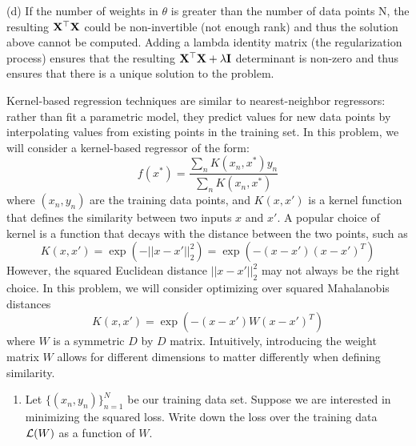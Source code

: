 \documentclass[submit]{harvardml}
\begin{document}
\bigskip \noindent (d) If the number of weights in $\theta$ is greater than the number of data points N, the resulting $\mathbf{X}^\top\mathbf{X}$ could be non-invertible (not enough rank) and thus the solution above cannot be computed. Adding a lambda identity matrix (the regularization process) ensures that the resulting $\mathbf{X}^\top\mathbf{X} + \lambda\mathbf{I}$ determinant is non-zero and thus ensures that there is a unique solution to the problem. 

\newpage

\begin{problem}

Kernel-based regression techniques are similar to nearest-neighbor
regressors: rather than fit a parametric model, they predict values
for new data points by interpolating values from existing points in
the training set.  In this problem, we will consider a kernel-based
regressor of the form:
\begin{equation*}
  f(x^*) = \frac{ \sum_{n} K(x_n,x^*) y_n  }{ \sum_{n} K(x_n,x^*) } 
\end{equation*}
where $(x_n,y_n)$ are the training data points, and $K(x,x')$ is a
kernel function that defines the similarity between two inputs $x$ and
$x'$.  A popular choice of kernel is a function that decays with
the distance between the two points, such as
\begin{equation*}
  K(x,x') = \exp(-||x-x'||^2_2) = \exp(-(x-x') (x-x')^T ) 
\end{equation*} 
However, the squared Euclidean distance $||x-x'||^2_2$ may not always
be the right choice.  In this problem, we will consider optimizing
over squared Mahalanobis distances
\begin{equation*}
  K(x,x') = \exp(-(x-x') W (x-x')^T ) 
  \label{eqn:distance}
\end{equation*} 
where $W$ is a symmetric $D$ by $D$ matrix.  Intuitively, introducing
the weight matrix $W$ allows for different dimensions to matter
differently when defining similarity.

\begin{enumerate}

\item Let $\{(x_n,y_n)\}_{n=1}^N$ be our training data set.  Suppose
  we are interested in minimizing the squared loss.  Write down the
  loss over the training data $\mathcal{L}(W)$ as a function of $W$.  


\end{enumerate}
\end{problem}
\end{document}
